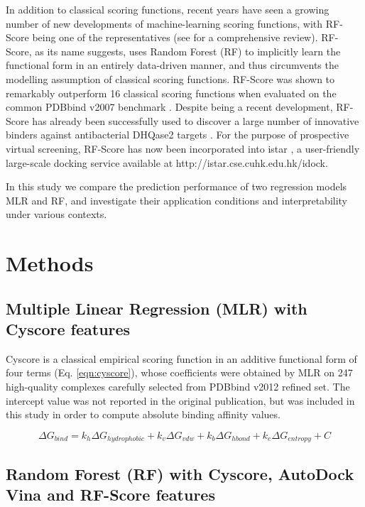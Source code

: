 \documentclass[journal=jacsat,manuscript=article]{achemso}
\begin{document}
In addition to classical scoring functions, recent years have seen a growing number of new developments of machine-learning scoring functions, with RF-Score \cite{564} being one of the representatives (see \cite{1373} for a comprehensive review). RF-Score, as its name suggests, uses Random Forest (RF) \cite{1309} to implicitly learn the functional form in an entirely data-driven manner, and thus circumvents the modelling assumption of classical scoring functions. RF-Score was shown to remarkably outperform 16 classical scoring functions when evaluated on the common PDBbind v2007 benchmark \cite{564}. Despite being a recent development, RF-Score has already been successfully used to discover a large number of innovative binders against antibacterial DHQase2 targets \cite{1281}. For the purpose of prospective virtual screening, RF-Score has now been incorporated into istar \cite{1362}, a user-friendly large-scale docking service available at http://istar.cse.cuhk.edu.hk/idock.

In this study we compare the prediction performance of two regression models MLR and RF, and investigate their application conditions and interpretability under various contexts.

\section{Methods}

\subsection{Multiple Linear Regression (MLR) with Cyscore features}

Cyscore is a classical empirical scoring function in an additive functional form of four terms (Eq. \ref{eqn:cyscore}), whose coefficients were obtained by MLR on 247 high-quality complexes carefully selected from PDBbind v2012 refined set. The intercept value was not reported in the original publication, but was included in this study in order to compute absolute binding affinity values.

\begin{equation}
\Delta G_{bind} = k_h\Delta G_{hydrophobic} + k_v\Delta G_{vdw} + k_b\Delta G_{hbond} + k_e\Delta G_{entropy} + C
\label{eqn:cyscore}
\end{equation}

\subsection{Random Forest (RF) with Cyscore, AutoDock Vina and RF-Score features}
\end{document}
